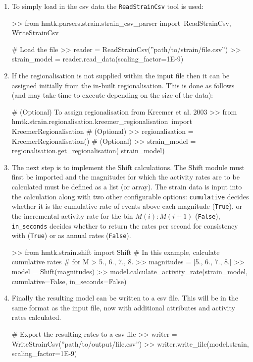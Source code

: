 \begin{enumerate}

\item To simply load in the csv data the \verb=ReadStrainCsv= tool is used:

\begin{python}[frame=single]
>> from hmtk.parsers.strain.strain_csv_parser import\
    ReadStrainCsv, WriteStrainCsv

# Load the file
>> reader = ReadStrainCsv(''path/to/strain/file.csv'')
>> strain_model = reader.read_data(scaling_factor=1E-9)
\end{python}

\item If the regionalisation is not supplied within the input file then it can be assigned initially from the in-built \cite{Kreemer_etal2003} regionalisation. This is done as follows (and may take time to execute depending on the size of the data):

\begin{python}[frame=single]
# (Optional) To assign regionalisation from Kreemer et al. 2003
>> from hmtk.strain.regionalisation.kreemer_regionalisation\
    import KreemerRegionalisation
# (Optional)
>> regionalisation = KreemerRegionalisation()
# (Optional)
>> strain_model = regionalisation.get_regionalisation(
    strain_model)
\end{python}

\item The next step is to implement the Shift calculations. The Shift module must first be imported and the magnitudes for which the activity rates are to be calculated must be defined as a list (or array). The strain data is input into the calculation along with two other configurable options: \verb=cumulative= decides whether it is the cumulative rate of events above each magnitude (\verb=True=), or the incremental activity rate for the bin $M \left( i \right):M \left( {i + 1} \right)$ (\verb=False=), \verb=in_seconds= decides whether to return the rates per second for consistency with \cite{Bird_etal2010} (\verb=True=) or as annual rates (\verb=False=). 

\begin{python}[frame=single]
>> from hmtk.strain.shift import Shift
# In this example, calculate cumulative rates 
# for M > 5., 6., 7., 8.
>> magnitudes = [5., 6., 7., 8.]
>> model = Shift(magnitudes)
>> model.calculate_activity_rate(strain_model,
                                 cumulative=False,
                                 in_seconds=False)
\end{python}

\item Finally the resulting model can be written to a csv file. This will be in the same format as the input file, now with additional attributes and activity rates calculated.

\begin{python}[frame=single]
# Export the resulting rates to a csv file
>> writer = WriteStrainCsv(''path/to/output/file.csv'')
>> writer.write_file(model.strain, scaling_factor=1E-9)
\end{python}
\end{enumerate}

